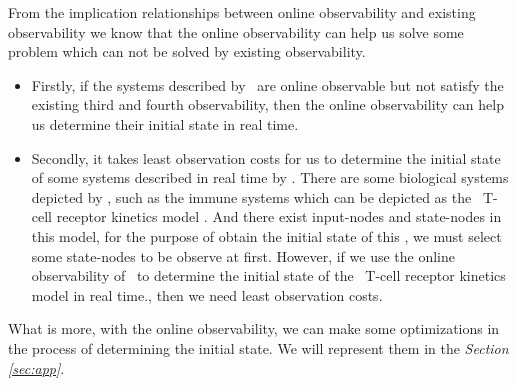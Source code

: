 From the implication relationships between online observability and existing observability we know that the online observability can help us solve some problem which can not be solved by existing observability. 
 \begin{itemize}
 \item Firstly, if the systems described by \BCNs\ are online observable but not satisfy the existing third and fourth observability, then the online observability can help us determine their initial state in real time. 
 \item Secondly, it takes least observation costs for us to determine the initial state of some systems described in real time by \BCNs. There are some biological systems depicted by \BCNs, such as the immune systems which can be depicted as the \BCN\ T-cell receptor kinetics model \cite{Klamt2006A}. And there exist input-nodes and state-nodes in this model, for the purpose of obtain the initial state of this \BCN, we must select some state-nodes to be observe at first. However, if we use the online observability of \BCNs\ to determine the initial state of the \BCN\ T-cell receptor kinetics model in real time., then we need least observation costs. 
 \end{itemize}

What is more, with the online observability, we can make some optimizations in the process of determining the initial state. We will represent them in the {\em Section \ref{sec:app}}.
   
   
